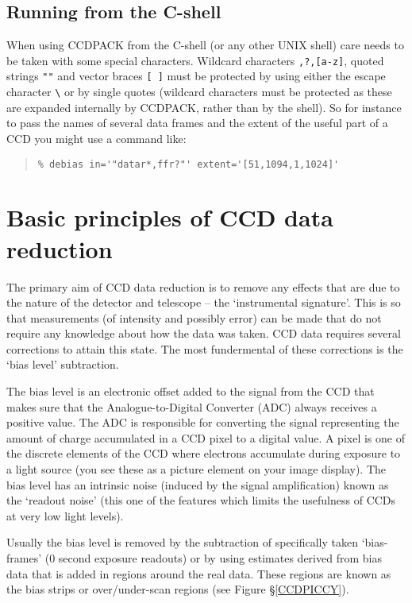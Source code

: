 \documentclass[twoside,11pt]{article}
\newcommand{\hyperref}[4]{#2\ref{#4}#3}
\newcommand{\xlabel}[1]{}
\renewcommand{\_}{\texttt{\symbol{95}}}
\newenvironment{myquote}{\begin{quote}\begin{small}}{\end{small}\end{quote}}
\newcommand{\text}[1]{{\small \tt #1}}
\begin{document}
\subsection{Running from the C-shell}
When using CCDPACK from the C-shell (or any other UNIX shell) care needs to
be taken with some special characters.
Wildcard characters \text{*,?,[a-z]}, quoted strings \text{""}
and vector braces \text{[ ]} must be protected by using either the
escape character {\small \verb+\+} or by single quotes (wildcard characters
must be protected as these are expanded internally by CCDPACK, rather than by
the shell).
So for instance to pass the names of several data frames and the extent
of the useful part of a CCD you might use a command like:
\begin{myquote}
\begin{verbatim}
% debias in='"datar*,ffr?"' extent='[51,1094,1,1024]'
\end{verbatim}
\end{myquote}

\section{Basic principles of CCD data reduction\xlabel{CCDprinciples}}

The primary aim of CCD data reduction is to remove any effects that are
due to the nature of the detector and telescope -- the `instrumental
signature'.
This is so that measurements (of intensity and possibly error) can be
made that do not require any knowledge about how the data was taken.
CCD data requires several corrections to attain this state.
The most fundermental of these corrections is the `bias level' subtraction.

The bias level is an electronic offset added to the signal from the
CCD that makes sure that the Analogue-to-Digital Converter (ADC)
always receives a positive value.
The ADC is responsible for converting the signal representing
the amount of charge accumulated in a CCD pixel to a digital value.
A pixel is one of the discrete elements of the CCD where electrons
accumulate during exposure to a light source (you see these as a
picture element on your image display).
The bias level has an intrinsic noise (induced by the signal
amplification) known as the `readout noise' (this one of the features
which limits the usefulness of CCDs at very low light levels).

Usually the bias level is removed by the subtraction of specifically
taken `bias-frames' ($0$ second exposure readouts) or by using
estimates derived from bias data that is added in regions around
the real data. These regions are known as the bias strips or
over/under-scan regions (see \hyperref{this figure}{Figure
\S}{}{CCDPICCY}).
\end{document}
